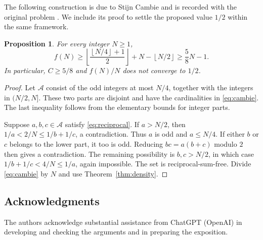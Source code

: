 \documentclass[11pt]{amsart}
\newtheorem{proposition}[theorem]{Proposition}
\theoremstyle{definition}
\theoremstyle{remark}
\numberwithin{equation}{section}
\newcommand{\cA}{\mathcal A}
\newcommand{\floor}[1]{\left\lfloor #1\right\rfloor}
\begin{document}
The following construction is due to Stijn Cambie and is recorded with the original problem \cite{Bloom}.
We include its proof to settle the proposed value $1/2$ within the same framework.

\begin{proposition}\label{prop:cambie}
For every integer $N\ge1$,
\begin{equation}\label{eq:cambie}
f(N)\ge\floor{\frac{\floor{N/4}+1}{2}}+N-\floor{N/2}
\ge\frac58N-1.
\end{equation}
In particular, $C\ge5/8$ and $f(N)/N$ does not converge to $1/2$.
\end{proposition}

\begin{proof}
Let $\cA$ consist of the odd integers at most $N/4$, together with the integers in $(N/2,N]$.
These two parts are disjoint and have the cardinalities in \eqref{eq:cambie}.
The last inequality follows from the elementary bounds for integer parts.

Suppose $a,b,c\in\cA$ satisfy \eqref{eq:reciprocal}.
If $a>N/2$, then $1/a<2/N\le1/b+1/c$, a contradiction.
Thus $a$ is odd and $a\le N/4$.
If either $b$ or $c$ belongs to the lower part, it too is odd.
Reducing $bc=a(b+c)$ modulo $2$ then gives a contradiction.
The remaining possibility is $b,c>N/2$, in which case
$1/b+1/c<4/N\le1/a$, again impossible.
The set is reciprocal-sum-free.
Divide \eqref{eq:cambie} by $N$ and use Theorem~\ref{thm:density}.
\end{proof}

\subsection*{Acknowledgments}
The authors acknowledge substantial assistance from ChatGPT (OpenAI) in developing and checking the arguments and in preparing the exposition.
\end{document}
